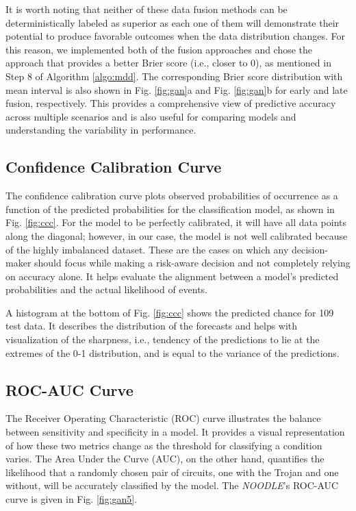 It is worth noting that neither of these data fusion methods can be deterministically labeled as superior \cite{gallo2017multimodal} as each one of them will demonstrate their potential to produce favorable outcomes when the data distribution changes. For this reason, we implemented both of the fusion approaches and chose the approach that provides a better Brier score (i.e., closer to 0), as mentioned in Step 8 of Algorithm \ref{algo:mdd}. The corresponding Brier score distribution with mean interval is also shown in Fig. \ref{fig:gan}a and Fig. \ref{fig:gan}b for early and late fusion, respectively. This provides a comprehensive view of predictive accuracy across multiple scenarios and is also useful for comparing models and understanding the variability in performance.

\subsection*{Confidence Calibration Curve}
The confidence calibration curve plots observed probabilities of occurrence as a function of the predicted probabilities for the classification model, as shown in Fig. \ref{fig:ccc}. For the model to be perfectly calibrated, it will have all data points along the diagonal; however, in our case, the model is not well calibrated because of the highly imbalanced dataset. These are the cases on which any decision-maker should focus while making a risk-aware decision and not completely relying on accuracy alone. It helps evaluate the alignment between a model's predicted probabilities and the actual likelihood of events.

A histogram at the bottom of Fig. \ref{fig:ccc} shows the predicted chance for 109 test data. It describes the distribution of the forecasts and helps with visualization of the sharpness, i.e., tendency of the predictions to lie at the extremes of the 0-1 distribution, and is equal to the variance of the predictions.

\subsection*{ROC-AUC Curve}
The Receiver Operating Characteristic (ROC) curve illustrates the balance between sensitivity and specificity in a model. It provides a visual representation of how these two metrics change as the threshold for classifying a condition varies. The Area Under the Curve (AUC), on the other hand, quantifies the likelihood that a randomly chosen pair of circuits, one with the Trojan and one without, will be accurately classified by the model. The \textit{NOODLE}'s ROC-AUC curve is given in Fig. \ref{fig:gan5}.

